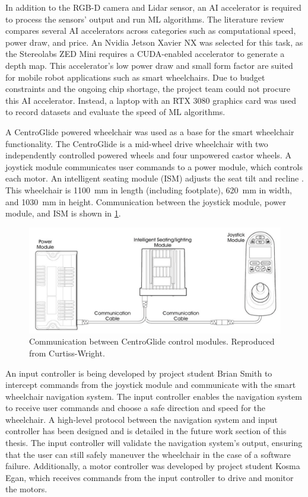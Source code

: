 In addition to the RGB-D camera and Lidar sensor, an AI accelerator is required to process the sensors'
output and run ML algorithms. The literature review compares several AI accelerators across categories
such as computational speed, power draw, and price. An Nvidia Jetson Xavier NX was selected for this task,
as the Stereolabs ZED Mini requires a CUDA-enabled accelerator to generate a depth map. This accelerator's
low power draw and small form factor are suited for mobile robot applications such as smart wheelchairs.
Due to budget constraints and the ongoing chip shortage, the project team could not procure this AI accelerator.
Instead, a laptop with an RTX 3080 graphics card was used to record datasets and evaluate the speed of
ML algorithms.

A CentroGlide powered wheelchair was used as a base for the smart wheelchair functionality.
The CentroGlide is a mid-wheel drive wheelchair with two independently controlled powered wheels and four
unpowered castor wheels.
A joystick module communicates user commands to a power module, which controls
each motor. An intelligent seating module (ISM) adjusts the seat tilt and recline \cite{glideCentroGlideOWNERUSER2022}.
This wheelchair is \SI{1100}{\milli\metre} in length (including footplate), \SI{620}{\milli\metre}
in width, and \SI{1030}{\milli\metre} in height.
Communication between the joystick module, power module, and ISM is shown in \cref{fig:module_communication}.

\begin{figure}[b]
    \centering
    \includegraphics[width=0.85\linewidth]{images/module_communication.png}
    \caption{Communication between CentroGlide control modules. Reproduced from Curtiss-Wright. \cite{curtiss-wrightPGDRIVESTECHNOLOGY2016}}
    \label{fig:module_communication}
\end{figure}

An input controller is being developed by project student Brian Smith to intercept
commands from the joystick module and communicate with the smart wheelchair navigation system.
The input controller enables the navigation system to receive user commands and choose a safe
direction and speed for the wheelchair.
A high-level protocol between the navigation system and input controller has been designed
and is detailed in the future work section of this thesis. The input controller will validate the
navigation system's output, ensuring that the user
can still safely maneuver the wheelchair in the case of a software failure.
Additionally, a motor controller was developed by project student
Kosma Egan, which receives commands from the input controller to drive and monitor the motors.
\pagebreak

